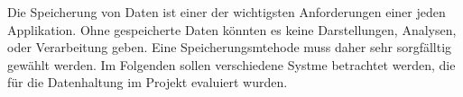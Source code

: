 Die Speicherung von Daten ist einer der wichtigsten Anforderungen einer jeden Applikation. Ohne gespeicherte Daten könnten es keine Darstellungen, Analysen, oder Verarbeitung geben. Eine Speicherungsmtehode muss daher sehr sorgfälltig gewählt werden. Im Folgenden sollen verschiedene Systme betrachtet werden, die für die Datenhaltung im Projekt evaluiert wurden.